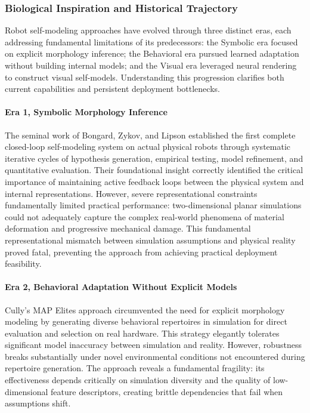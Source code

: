 ﻿\documentclass[11pt,a4paper]{article}
\begin{document}
\subsubsection{Biological Inspiration and Historical Trajectory}

Robot self-modeling approaches have evolved through three distinct eras, each addressing fundamental limitations of its predecessors: the Symbolic era focused on explicit morphology inference; the Behavioral era pursued learned adaptation without building internal models; and the Visual era leveraged neural rendering to construct visual self-models. Understanding this progression clarifies both current capabilities and persistent deployment bottlenecks.

\paragraph{Era 1, Symbolic Morphology Inference}
The seminal work of Bongard, Zykov, and Lipson established the first complete closed-loop self-modeling system on actual physical robots through systematic iterative cycles of hypothesis generation, empirical testing, model refinement, and quantitative evaluation. Their foundational insight correctly identified the critical importance of maintaining active feedback loops between the physical system and internal representations. However, severe representational constraints fundamentally limited practical performance: two-dimensional planar simulations could not adequately capture the complex real-world phenomena of material deformation and progressive mechanical damage. This fundamental representational mismatch between simulation assumptions and physical reality proved fatal, preventing the approach from achieving practical deployment feasibility.

\paragraph{Era 2, Behavioral Adaptation Without Explicit Models}
Cully's MAP Elites approach circumvented the need for explicit morphology modeling by generating diverse behavioral repertoires in simulation for direct evaluation and selection on real hardware. This strategy elegantly tolerates significant model inaccuracy between simulation and reality. However, robustness breaks substantially under novel environmental conditions not encountered during repertoire generation. The approach reveals a fundamental fragility: its effectiveness depends critically on simulation diversity and the quality of low-dimensional feature descriptors, creating brittle dependencies that fail when assumptions shift.
\end{document}

